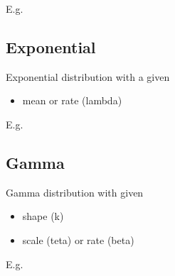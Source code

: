 \documentclass[letterpaper,10pt,english]{sphinxmanual}
\begin{document}
E.g.

%
\begin{sphinxVerbatim}[commandchars=\\\{\}]
     
\end{sphinxVerbatim}


\subsection{Exponential}
\label{\detokenize{Distributions:exponential}}
Exponential distribution with a given
\begin{itemize}
\item {} 
mean or rate (lambda)

\end{itemize}

E.g.

%
\begin{sphinxVerbatim}[commandchars=\\\{\}]
    
\end{sphinxVerbatim}


\subsection{Gamma}
\label{\detokenize{Distributions:gamma}}
Gamma distribution with given
\begin{itemize}
\item {} 
shape (k)

\item {} 
scale (teta) or rate (beta)

\end{itemize}

E.g.

%
\begin{sphinxVerbatim}[commandchars=\\\{\}]
    
\end{sphinxVerbatim}
\end{document}
